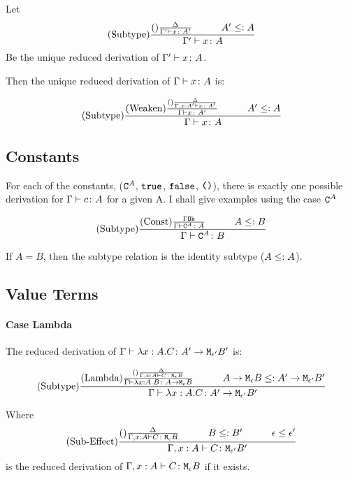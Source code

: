 {    Let 
    \begin{equation}
        \deltavrule{\G'}{x}{A'}{A}
    \end{equation}
    Be the  unique reduced derivation of $\Gamma' \vdash x \colon A$.

    Then the unique reduced derivation of $\Gamma \vdash x \colon A$ is:


    \begin{equation}
        \treerule{Subtype}{
            \treerule{Weaken}{
                \treerule{}{\D}{\typerelation{\G, x: A'}{x}{A'}}
            }{\gtyperelation{x}{A'}}   
        \s\s A' \subtype A
        }{\gtyperelation{x}{A}}
    \end{equation}

    \subsection{Constants}
    For each of the constants, ($\texttt{C}^{A}$, $\texttt{true}$, $\texttt{false}$, $\texttt{()}$), there is exactly one possible derivation for $\Gamma \vdash c \colon A$ for a given A. I shall give examples using the case $\texttt{C}^{A}$


    $$
        \treerule{Subtype}{\truleconst\s\s A \subtype B}{\gtyperelation{\const{A}}{B}}
    $$

    If $A = B$, then the subtype relation is the identity subtype ($A \leq: A$).

    \subsection{Value Terms}
    \paragraph{Case Lambda}
    The reduced derivation of $\Gamma \vdash \lambda x : A. C \colon A' \rightarrow \texttt{M}_{\epsilon'}{B'}$ is:


    $$
    \treerule{Subtype}
    {\treerule{Lambda}{\treerule{}{\D}{\typerelation{\gax}{C}{\meb}}}
    {
        \gtyperelation{\lam{x}{A}{B}}{\aeb}}
        \s\s
        \aeb \subtype \lamtype{A'}{\e'}{B'}
    }{
       \gtyperelation{\lam{x}{A}{C}}{\lamtype{A'}{\e'}{B'}} 
    }
    $$

    Where 
    \begin{equation}
        \treerule{Sub-Effect}{\treerule{}{\D}{\typerelation{\gax}{C}{\meb}}\s\s B\subtype B'\s\s \e \subeffect \e'}{\typerelation{\gax}{C}{\M{\e'}{B'}}}
    \end{equation}
    is the reduced derivation of $\Gamma, x: A \vdash C \colon \texttt{M}_{\epsilon}{B}$ if it exists.

}
